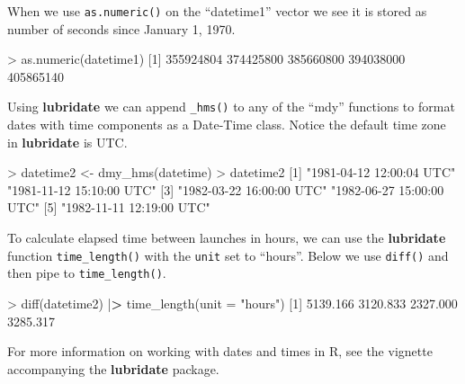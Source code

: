 \documentclass[
]{book}
\newenvironment{Shaded}{\begin{snugshade}}{\end{snugshade}}
\newcommand{\AttributeTok}[1]{\textcolor[rgb]{0.77,0.63,0.00}{#1}}
\newcommand{\DecValTok}[1]{\textcolor[rgb]{0.00,0.00,0.81}{#1}}
\newcommand{\ErrorTok}[1]{\textcolor[rgb]{0.64,0.00,0.00}{\textbf{#1}}}
\newcommand{\FloatTok}[1]{\textcolor[rgb]{0.00,0.00,0.81}{#1}}
\newcommand{\FunctionTok}[1]{\textcolor[rgb]{0.00,0.00,0.00}{#1}}
\newcommand{\NormalTok}[1]{#1}
\newcommand{\OtherTok}[1]{\textcolor[rgb]{0.56,0.35,0.01}{#1}}
\newcommand{\SpecialCharTok}[1]{\textcolor[rgb]{0.00,0.00,0.00}{#1}}
\newcommand{\StringTok}[1]{\textcolor[rgb]{0.31,0.60,0.02}{#1}}
\begin{document}
When we use \texttt{as.numeric()} on the ``datetime1'' vector we see it is stored as number of seconds since January 1, 1970.

\begin{Shaded}
\begin{Highlighting}[]
\SpecialCharTok{\textgreater{}} \FunctionTok{as.numeric}\NormalTok{(datetime1)}
\NormalTok{[}\DecValTok{1}\NormalTok{] }\DecValTok{355924804} \DecValTok{374425800} \DecValTok{385660800} \DecValTok{394038000} \DecValTok{405865140}
\end{Highlighting}
\end{Shaded}

Using \textbf{lubridate} we can append \texttt{\_hms()} to any of the ``mdy'' functions to format dates with time components as a Date-Time class. Notice the default time zone in \textbf{lubridate} is UTC.

\begin{Shaded}
\begin{Highlighting}[]
\SpecialCharTok{\textgreater{}}\NormalTok{ datetime2 }\OtherTok{\textless{}{-}} \FunctionTok{dmy\_hms}\NormalTok{(datetime)}
\SpecialCharTok{\textgreater{}}\NormalTok{ datetime2}
\NormalTok{[}\DecValTok{1}\NormalTok{] }\StringTok{"1981{-}04{-}12 12:00:04 UTC"} \StringTok{"1981{-}11{-}12 15:10:00 UTC"}
\NormalTok{[}\DecValTok{3}\NormalTok{] }\StringTok{"1982{-}03{-}22 16:00:00 UTC"} \StringTok{"1982{-}06{-}27 15:00:00 UTC"}
\NormalTok{[}\DecValTok{5}\NormalTok{] }\StringTok{"1982{-}11{-}11 12:19:00 UTC"}
\end{Highlighting}
\end{Shaded}

To calculate elapsed time between launches in hours, we can use the \textbf{lubridate} function \texttt{time\_length()} with the \texttt{unit} set to ``hours''. Below we use \texttt{diff()} and then pipe to \texttt{time\_length()}.

\begin{Shaded}
\begin{Highlighting}[]
\SpecialCharTok{\textgreater{}} \FunctionTok{diff}\NormalTok{(datetime2) }\SpecialCharTok{|}\ErrorTok{\textgreater{}} \FunctionTok{time\_length}\NormalTok{(}\AttributeTok{unit =} \StringTok{"hours"}\NormalTok{)}
\NormalTok{[}\DecValTok{1}\NormalTok{] }\FloatTok{5139.166} \FloatTok{3120.833} \FloatTok{2327.000} \FloatTok{3285.317}
\end{Highlighting}
\end{Shaded}

For more information on working with dates and times in R, see the vignette accompanying the \textbf{lubridate} package.
\end{document}
